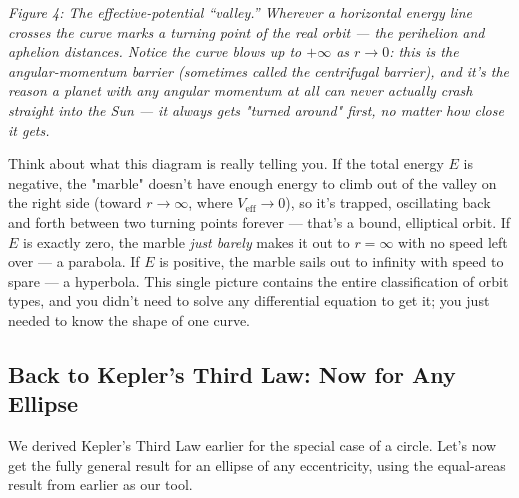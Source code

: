 \documentclass[11pt]{article}
\begin{document}
\begin{center}
\end{center}
\begin{center}\textit{Figure 4: The effective-potential ``valley.'' Wherever a horizontal energy
line crosses the curve marks a turning point of the real orbit --- the perihelion and aphelion
distances. Notice the curve blows up to $+\infty$ as $r\to0$: this is the angular-momentum barrier
(sometimes called the centrifugal barrier), and it's the reason a planet with any angular momentum
at all can never actually crash straight into the Sun --- it always gets "turned around" first, no
matter how close it gets.}\end{center}

Think about what this diagram is really telling you. If the total energy $E$ is negative, the
"marble" doesn't have enough energy to climb out of the valley on the right side (toward
$r\to\infty$, where $V_{\text{eff}}\to0$), so it's trapped, oscillating back and forth between two
turning points forever --- that's a bound, elliptical orbit. If $E$ is exactly zero, the marble
\emph{just barely} makes it out to $r=\infty$ with no speed left over --- a parabola. If $E$ is
positive, the marble sails out to infinity with speed to spare --- a hyperbola. This single picture
contains the entire classification of orbit types, and you didn't need to solve any differential
equation to get it; you just needed to know the shape of one curve.

\subsection{Back to Kepler's Third Law: Now for Any Ellipse}

We derived Kepler's Third Law earlier for the special case of a circle. Let's now get the fully
general result for an ellipse of any eccentricity, using the equal-areas result from earlier as
our tool.
\end{document}
